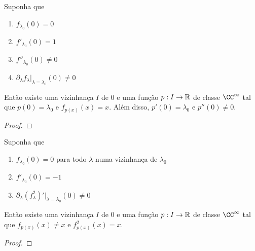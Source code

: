 \begin{theorem}
Suponha que
\begin{enumerate}
\item $f_{\lambda_0}(0) = 0$
\item $f'_{\lambda_0}(0) = 1$
\item $f''_{\lambda_0}(0) \neq 0$
\item $\partial_\lambda f_\lambda |_{\lambda = \lambda_0}(0) \neq 0$
\end{enumerate}
Então existe uma vizinhança $I$ de $0$ e uma função $p: I \to \mathbb{R}$ de classe $\CC^\infty$ tal que $p(0) = \lambda_0$ e $f_{p(x)}(x) = x$. Além disso, $p'(0) = \lambda_0$ e $p''(0) \neq 0$.
\end{theorem}

\begin{proof}

\end{proof}

\begin{theorem}
Suponha que
\begin{enumerate}
\item $f_{\lambda_0}(0) = 0$ para todo $\lambda$ numa vizinhança de $\lambda_0$
\item $f'_{\lambda_0}(0) = -1$
\item $\partial_\lambda (f^2_\lambda)' |_{\lambda = \lambda_0}(0) \neq 0$
\end{enumerate}
Então existe uma vizinhança $I$ de $0$ e uma função $p: I \to \mathbb{R}$ de classe $\CC^\infty$ tal que $f_{p(x)}(x) \neq x$ e  $f^2_{p(x)}(x) = x$.
\end{theorem}

\begin{proof}

\end{proof}